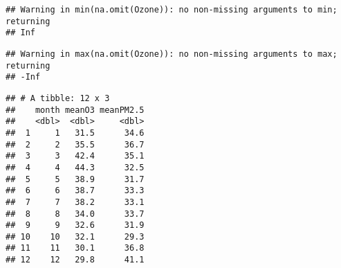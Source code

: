 \documentclass[]{article}
\newenvironment{Shaded}{\begin{snugshade}}{\end{snugshade}}
\newcommand{\KeywordTok}[1]{\textcolor[rgb]{0.13,0.29,0.53}{\textbf{#1}}}
\newcommand{\DataTypeTok}[1]{\textcolor[rgb]{0.13,0.29,0.53}{#1}}
\newcommand{\DecValTok}[1]{\textcolor[rgb]{0.00,0.00,0.81}{#1}}
\newcommand{\StringTok}[1]{\textcolor[rgb]{0.31,0.60,0.02}{#1}}
\newcommand{\CommentTok}[1]{\textcolor[rgb]{0.56,0.35,0.01}{\textit{#1}}}
\newcommand{\OperatorTok}[1]{\textcolor[rgb]{0.81,0.36,0.00}{\textbf{#1}}}
\newcommand{\NormalTok}[1]{#1}
\begin{document}
\begin{Shaded}
\end{Shaded}

\begin{verbatim}
## Warning in min(na.omit(Ozone)): no non-missing arguments to min; returning
## Inf
\end{verbatim}

\begin{verbatim}
## Warning in max(na.omit(Ozone)): no non-missing arguments to max; returning
## -Inf
\end{verbatim}

\begin{Shaded}
\end{Shaded}

\begin{verbatim}
## # A tibble: 12 x 3
##    month meanO3 meanPM2.5
##    <dbl>  <dbl>     <dbl>
##  1     1   31.5      34.6
##  2     2   35.5      36.7
##  3     3   42.4      35.1
##  4     4   44.3      32.5
##  5     5   38.9      31.7
##  6     6   38.7      33.3
##  7     7   38.2      33.1
##  8     8   34.0      33.7
##  9     9   32.6      31.9
## 10    10   32.1      29.3
## 11    11   30.1      36.8
## 12    12   29.8      41.1
\end{verbatim}
\end{document}
